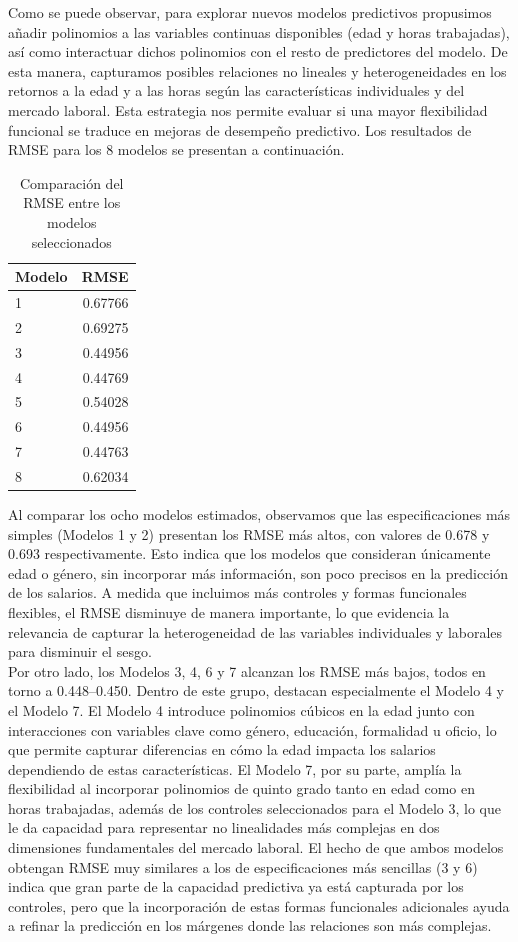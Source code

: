 \documentclass[12pt,a4paper,onecolumn]{article}
\begin{document}
Como se puede observar, para explorar nuevos modelos predictivos propusimos añadir polinomios a las variables continuas disponibles (edad y horas trabajadas), así como interactuar dichos polinomios con el resto de predictores del modelo. De esta manera, capturamos posibles relaciones no lineales y heterogeneidades en los retornos a la edad y a las horas según las características individuales y del mercado laboral. Esta estrategia nos permite evaluar si una mayor flexibilidad funcional se traduce en mejoras de desempeño predictivo. Los resultados de RMSE para los 8 modelos se presentan a continuación.


\begin{table}[htbp]
\centering
\begin{tabular}{l r}
\hline
Modelo & RMSE \\
\hline
1 & 0.67766 \\
2 & 0.69275 \\
3 & 0.44956 \\
4 & 0.44769 \\
5 & 0.54028 \\
6 & 0.44956 \\
7 & 0.44763  \\
8 & 0.62034 \\
\hline
\end{tabular}
\caption{Comparación del RMSE entre los modelos seleccionados}
\label{tab:scores}
\end{table}

Al comparar los ocho modelos estimados, observamos que las especificaciones más simples (Modelos 1 y 2) presentan los RMSE más altos, con valores de 0.678 y 0.693 respectivamente. Esto indica que los modelos que consideran únicamente edad o género, sin incorporar más información, son poco precisos en la predicción de los salarios. A medida que incluimos más controles y formas funcionales flexibles, el RMSE disminuye de manera importante, lo que evidencia la relevancia de capturar la heterogeneidad de las variables individuales y laborales para disminuir el sesgo.\\

Por otro lado, los Modelos 3, 4, 6 y 7 alcanzan los RMSE más bajos, todos en torno a 0.448–0.450. Dentro de este grupo, destacan especialmente el Modelo 4 y el Modelo 7. El Modelo 4 introduce polinomios cúbicos en la edad junto con interacciones con variables clave como género, educación, formalidad u oficio, lo que permite capturar diferencias en cómo la edad impacta los salarios dependiendo de estas características. El Modelo 7, por su parte, amplía la flexibilidad al incorporar polinomios de quinto grado tanto en edad como en horas trabajadas, además de los controles seleccionados para el Modelo 3, lo que le da capacidad para representar no linealidades más complejas en dos dimensiones fundamentales del mercado laboral. El hecho de que ambos modelos obtengan RMSE muy similares a los de especificaciones más sencillas (3 y 6) indica que gran parte de la capacidad predictiva ya está capturada por los controles, pero que la incorporación de estas formas funcionales adicionales ayuda a refinar la predicción en los márgenes donde las relaciones son más complejas.\\
\end{document}
